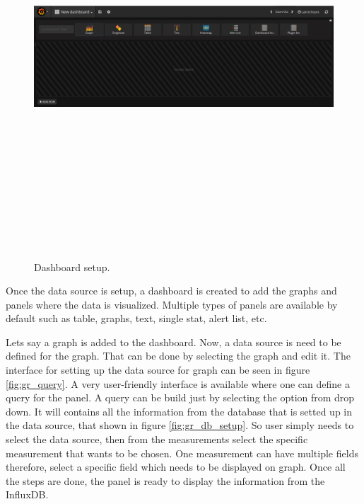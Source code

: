  \begin{figure}[htpb]
	\centering
	\includegraphics[width=16cm,height=15cm,keepaspectratio=true]{images/dashboard}
	\caption{
		Dashboard setup.
	}
	\label{fig:dashboard}
\end{figure}

Once the data source is setup, a dashboard is created to add the graphs and panels where the data is visualized. Multiple types of panels are available by default such as table, graphs, text, single stat, alert list, etc.

Lets say a graph is added to the dashboard. Now, a data source is need to be defined for the graph. That can be done by selecting the graph and edit it. The interface for setting up the data source for graph can be seen in figure \ref{fig:gr_query}. A very user-friendly interface is available where one can define a query for the panel. A query can be build just by selecting the option from drop down. It will contains all the information from the database that is setted up in the data source, that shown in figure \ref{fig:gr_db_setup}. So user simply needs to select the data source, then from the measurements select the specific measurement that wants to be chosen. One measurement can have multiple fields therefore, select a specific field which needs to be displayed on graph. Once all the steps are done, the panel is ready to display the information from the InfluxDB.


